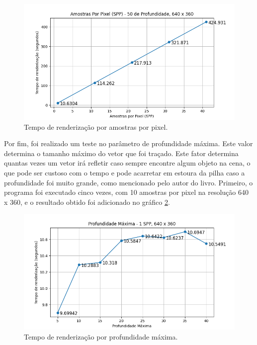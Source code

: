\documentclass[journal]{IEEEtran}
\begin{document}
\begin{figure}[ht]
  \centering
  \includegraphics[width=\linewidth]{media/Desktop_SPP.png}
  \caption{Tempo de renderização por amostras por pixel.}
  \label{img_desktop_spp}
\end{figure}

Por fim, foi realizado um teste no parâmetro de profundidade máxima. Este valor determina o tamanho máximo
do vetor que foi traçado. Este fator determina quantas vezes um vetor irá refletir caso sempre encontre algum
objeto na cena, o que pode ser custoso com o tempo e pode acarretar em estoura da pilha caso a profundidade
foi muito grande, como mencionado pelo autor do livro. Primeiro, o programa foi executado cinco vezes, com
10 amostras por pixel na resolução 640 x 360, e o resultado obtido foi adicionado no gráfico \ref{img_desktop_md1}.

\begin{figure}[ht]
  \centering
  \includegraphics[width=\linewidth]{media/Desktop_MD_1SPP.png}
  \caption{Tempo de renderização por profundidade máxima.}
  \label{img_desktop_md1}
\end{figure}
\end{document}
